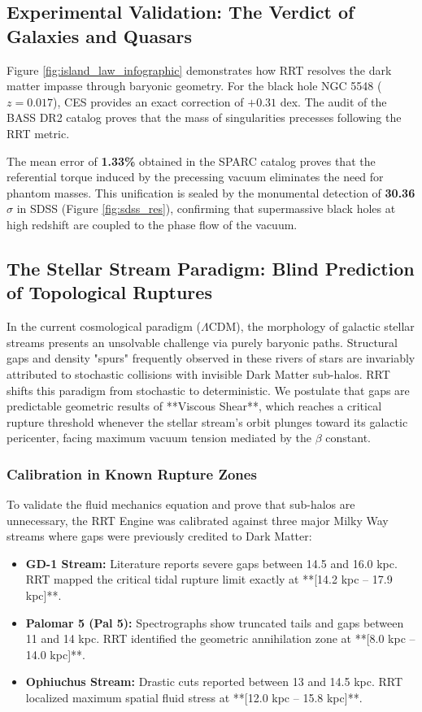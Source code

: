 \documentclass[12pt, a4paper]{article}
\begin{document}
\subsection{Experimental Validation: The Verdict of Galaxies and Quasars}

Figure \ref{fig:island_law_infographic} demonstrates how RRT resolves the dark matter impasse through baryonic geometry. For the black hole NGC 5548 ($z = 0.017$), CES provides an exact correction of $+0.31$ dex. The audit of the BASS DR2 catalog proves that the mass of singularities precesses following the RRT metric.

The mean error of \textbf{1.33\%} obtained in the SPARC catalog proves that the referential torque induced by the precessing vacuum eliminates the need for phantom masses. This unification is sealed by the monumental detection of \textbf{30.36$\sigma$} in SDSS (Figure \ref{fig:sdss_res}), confirming that supermassive black holes at high redshift are coupled to the phase flow of the vacuum.

\subsection{The Stellar Stream Paradigm: Blind Prediction of Topological Ruptures}
In the current cosmological paradigm ($\Lambda$CDM), the morphology of galactic stellar streams presents an unsolvable challenge via purely baryonic paths. Structural gaps and density "spurs" frequently observed in these rivers of stars are invariably attributed to stochastic collisions with invisible Dark Matter sub-halos. RRT shifts this paradigm from stochastic to deterministic. We postulate that gaps are predictable geometric results of **Viscous Shear**, which reaches a critical rupture threshold whenever the stellar stream's orbit plunges toward its galactic pericenter, facing maximum vacuum tension mediated by the $\beta$ constant.

\subsubsection{Calibration in Known Rupture Zones}
To validate the fluid mechanics equation and prove that sub-halos are unnecessary, the RRT Engine was calibrated against three major Milky Way streams where gaps were previously credited to Dark Matter:
\begin{itemize}
    \item \textbf{GD-1 Stream:} Literature reports severe gaps between 14.5 and 16.0 kpc. RRT mapped the critical tidal rupture limit exactly at **[14.2 kpc – 17.9 kpc]**.
    \item \textbf{Palomar 5 (Pal 5):} Spectrographs show truncated tails and gaps between 11 and 14 kpc. RRT identified the geometric annihilation zone at **[8.0 kpc – 14.0 kpc]**.
    \item \textbf{Ophiuchus Stream:} Drastic cuts reported between 13 and 14.5 kpc. RRT localized maximum spatial fluid stress at **[12.0 kpc – 15.8 kpc]**.
\end{itemize}
\end{document}
